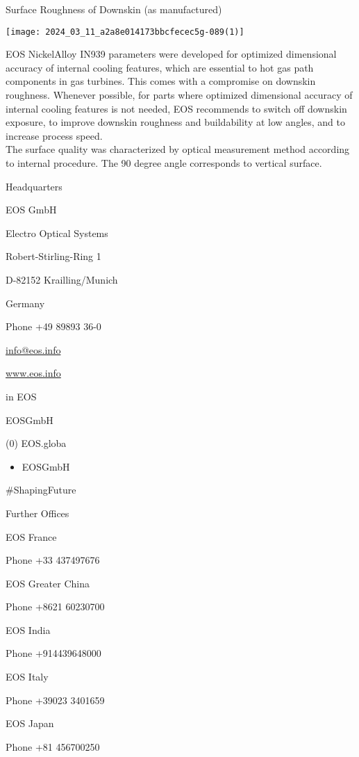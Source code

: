 \documentclass[10pt]{article}
\begin{document}
Surface Roughness of Downskin (as manufactured)

\begin{center}
\texttt{[image: 2024\_03\_11\_a2a8e014173bbcfecec5g-089(1)]}
\end{center}

EOS NickelAlloy IN939 parameters were developed for optimized dimensional accuracy of internal cooling features, which are essential to hot gas path components in gas turbines. This comes with a compromise on downskin roughness. Whenever possible, for parts where optimized dimensional accuracy of internal cooling features is not needed, EOS recommends to switch off downskin exposure, to improve downskin roughness and buildability at low angles, and to increase process speed.\\
The surface quality was characterized by optical measurement method according to internal procedure. The 90 degree angle corresponds to vertical surface.

Headquarters

EOS GmbH

Electro Optical Systems

Robert-Stirling-Ring 1

D-82152 Krailling/Munich

Germany

Phone +49 89893 36-0

\href{mailto:info@eos.info}{info@eos.info}

\href{http://www.eos.info}{www.eos.info}

in EOS

EOSGmbH

(0) EOS.globa

\begin{itemize}
  \item EOSGmbH
\end{itemize}

\#ShapingFuture

Further Offices

EOS France

Phone +33 437497676

EOS Greater China

Phone +8621 60230700

EOS India

Phone +914439648000

EOS Italy

Phone +39023 3401659

EOS Japan

Phone +81 456700250
\end{document}
